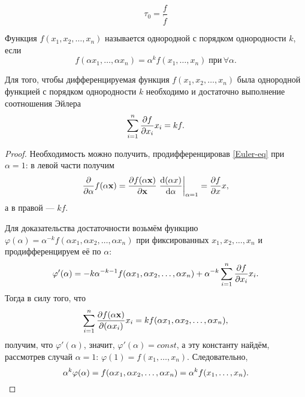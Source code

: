 \begin{dfn}
\begin{equation}
\tau_0 = \frac{f}{\dot{f}}
\end{equation}
\end{dfn}

\begin{dfn}
Функция $f(x_1, x_2, \dots, x_n)$ называется однородной с порядком однородности $k$, если
\begin{equation}
f(\alpha x_1, \dots, \alpha x_n) = \alpha^k f(x_1,  \dots, x_n) \; \text{при}\, \forall \alpha.
\end{equation}
\end{dfn}

\begin{lem}
Для того, чтобы дифференцируемая функция   $f(x_1 , x_2, \dots, x_n)$  была однородной функцией с порядком однородности   $k$ необходимо и достаточно выполнение соотношения Эйлера
\begin{equation}
\sum_{i=1}^n \pdv{f}{x_i} x_i = kf. \label{Euler-eq} 
\end{equation}
\end{lem}
\begin{proof}
Необходимость можно получить, продифференцировав \eqref{Euler-eq} при $\alpha = 1$: в левой части получим
\begin{equation*}
\pdv{\alpha} f(\alpha \vb{x}) = \pdv{f(\alpha \vb{x})}{\vb{x}} \left. \dv{(\alpha x)}{\alpha} \right|_{\alpha = 1} = \pdv{f}{x} x,
\end{equation*}
а в правой --- $kf$.

Для доказательства достаточности возьмём функцию   $ \varphi (\alpha)=\alpha ^{-k}f(\alpha x_{1},\alpha x_{2}, \dots ,\alpha x_{n})$ при фиксированных $x_1 , x_2, \dots, x_n$ и продифференцируем её по  $\alpha$: 
\begin{equation*}
\varphi'(\alpha) = - k \alpha^{-k-1} f(\alpha x_{1},\alpha x_{2}, \dots ,\alpha x_{n}) + \alpha ^{-k} \sum_{i=1}^n \pdv{f}{x_i} x_i.
\end{equation*}
Тогда в силу того, что 
\begin{equation*}
\sum_{i=1}^n \pdv{f(\alpha\vb{x})}{(\alpha x_i)} x_i = k f(\alpha x_{1},\alpha x_{2}, \dots ,\alpha x_{n}),
\end{equation*}
получим, что $\varphi'(\alpha)$, значит, $\varphi'(\alpha) = const$, а эту константу найдём, рассмотрев случай $\alpha =1$: $\varphi(1) = f(x_1,  \dots, x_n)$. Следовательно, 
\begin{equation*}
\alpha^k \varphi(\alpha) = f(\alpha x_{1},\alpha x_{2}, \dots ,\alpha x_{n}) = \alpha^k f(x_1,  \dots, x_n). \qedhere
\end{equation*}
\end{proof}


